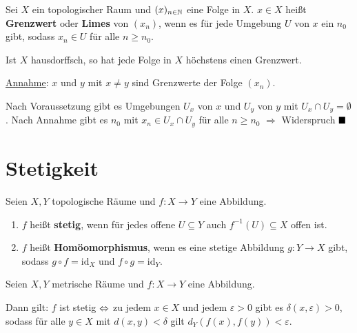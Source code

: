 \begin{definition}  
    Sei $X$ ein topologischer Raum und $(x)_{n \in \mathbb{N}}$ eine Folge
    in $X$. $x \in X$ heißt \textbf{Grenzwert} oder \textbf{Limes}
    von $(x_n)$, wenn es für jede Umgebung $U$ von $x$ ein $n_0$ gibt,
    sodass $x_n \in U$ für alle $n \geq n_0$.
\end{definition}

\begin{korollar}
    Ist $X$ hausdorffsch, so hat jede Folge in $X$ höchstens einen
    Grenzwert.
\end{korollar}

\begin{beweis}
    \underline{Annahme}: $x$ und $y$ mit $x \neq y$ sind Grenzwerte der Folge $(x_n)$.

    Nach Voraussetzung gibt es Umgebungen $U_x$ von $x$ und $U_y$
    von $y$ mit $U_x \cap U_y = \emptyset$. Nach Annahme gibt es
    $n_0$ mit $x_n \in U_x \cap U_y$ für alle $n \geq n_0$
    $\Rightarrow$ Widerspruch   $\qed$
\end{beweis}

\section{Stetigkeit}
\begin{definition}  
    Seien $X, Y$ topologische Räume und $f:X \rightarrow Y$ eine Abbildung.

    \begin{enumerate}[label=\alph*),ref=\theplaindefinition.\alph*]
        \item $f$ heißt \textbf{stetig}, wenn für jedes offene 
              $U \subseteq Y$ auch $f^{-1} (U) \subseteq X$ offen ist. \label{def:stetigkeit}
        \item $f$ heißt \textbf{Homöomorphismus}, wenn es eine 
              stetige Abbildung  $g: Y \rightarrow X$ gibt, sodass
              $g \circ f = \text{id}_X$ und $f \circ g = \text{id}_Y$.
    \end{enumerate}
\end{definition}

\begin{korollar}
    Seien $X, Y$ metrische Räume und $f: X \rightarrow Y$ eine Abbildung.

    Dann gilt: $f$ ist stetig $\Leftrightarrow$ zu jedem $x \in X$ und jedem
    $\varepsilon > 0$ gibt es $\delta(x, \varepsilon) > 0$, sodass für
    alle $y \in X$ mit $d(x,y) < \delta $ gilt 
    $d_Y(f(x), f(y)) < \varepsilon$.
\end{korollar}

